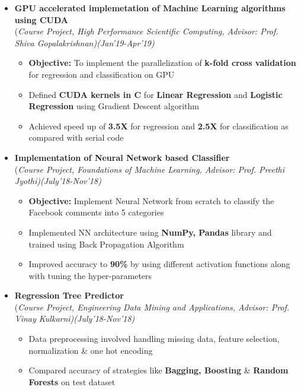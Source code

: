 \documentclass[a4paper,10pt]{article}
\begin{document}
\begin{itemize}
\item \textbf{GPU accelerated implemetation of Machine Learning algorithms using CUDA}\\
(\emph{Course Project, High Performance Scientific Computing, Advisor: Prof. Shiva Gopalakrishnan)\hfill (Jan'19-Apr’19)} \\[-0.4cm]
	\begin{itemize}[noitemsep,nolistsep]
	\item \textbf{Objective:} To implement the parallelization of \textbf{k-fold cross validation} for regression and classification on GPU
    \item Defined \textbf{CUDA kernels in C} for \textbf{Linear Regression} and \textbf{Logistic Regression} using Gradient Descent algorithm
    \item Achieved speed up of  \textbf{3.5X} for regression and \textbf{2.5X} for classification as compared with serial code
	\end{itemize}
	
\item \textbf{Implementation of Neural Network based Classifier} \\ 
(\emph{Course Project, Foundations of Machine Learning, Advisor: Prof. Preethi Jyothi)\hfill (July'18-Nov’18)} \\[-0.4cm]
	\begin{itemize}[noitemsep,nolistsep]
	\item \textbf{Objective:} Implement Neural Network from scratch to classify the Facebook comments into 5 categories %
    \item Implemented NN architecture using \textbf{NumPy, Pandas} library and trained using Back Propagation Algorithm
    \item Improved accuracy to \textbf{90\%} by using different activation functions along with tuning the hyper-parameters
	\end{itemize}
	
	\item \textbf{Regression Tree Predictor} \\ 
(\emph{Course Project, Engineering Data Mining and Applications, Advisor: Prof. Vinay Kulkarni)\hfill (July'18-Nov’18)} \\[-0.4cm]
	\begin{itemize}[noitemsep,nolistsep]
	\item Data preprocessing involved handling missing data, feature selection, normalization \& one hot encoding  %
    \item Compared accuracy of strategies like \textbf{Bagging, Boosting} \& \textbf{Random Forests} on test dataset
	\end{itemize}
	

\end{itemize}
\end{document}
